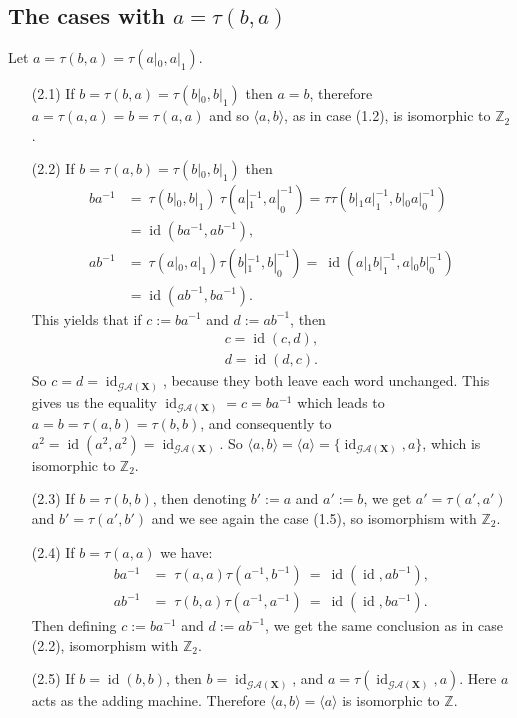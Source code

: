 \documentclass[mat1]{fmfdeloTS2.0}
\newcommand{\Z}{\mathbb Z}
\newcommand{\abece}{\mathbf{X}}			%
\newcommand{\synaut}{\mathcal{GA}}	%
\DeclareMathOperator{\id}{\mathrm{id}}			%
\begin{document}
\subsection{The cases with \texorpdfstring{$a=\tau(b,a)$}{}}

Let $a=\tau(b,a)=\tau(a|_0,a|_1)$.
\begin{itemize}
\item[(2.1)] If $b=\tau(b,a)=\tau(b|_0,b|_1)$ then $a=b$, therefore $a=\tau(a,a)=b=\tau(a,a)$ and so $\langle a,b\rangle $, as in case (1.2), is isomorphic to $\Z_2$.
\item[(2.2)] If $b=\tau(a,b)=\tau(b|_0,b|_1)$ then
\begin{align*}
 ba^{-1}&=	\:\tau(b|_0,b|_1)\:\tau(a|_1^{-1},a|_0^{-1})=	\tau\tau(b|_1a|_1^{-1},b|_0a|_0^{-1})\\
		&=\id(ba^{-1},ab^{-1}),\\
 ab^{-1}&=	\:\tau(a|_0,a|_1)\tau(b|_1^{-1},b|_0^{-1})=	\:\id(a|_1b|_1^{-1},a|_0b|_0^{-1})\\
 		&=\id(ab^{-1},ba^{-1}).
\end{align*}
This yields that if $c:=ba^{-1}$ and $d:=ab^{-1}$, then
\begin{align*}
 c=\id(c,d),\\
 d=\id(d,c).
\end{align*}
So $c=d=\id_{\synaut(\abece)}$, because they both leave each word unchanged. This gives us the equality $\id_{\synaut(\abece)}=c=ba^{-1}$ which leads to $a=b=\tau(a,b)=\tau(b,b)$, and consequently to $a^2=\id(a^2,a^2)=\id_{\synaut(\abece)}$. So $\langle a,b\rangle =\langle a\rangle =\{\id_{\synaut(\abece)},a\}$, which is isomorphic to $\Z_2$.
\item[(2.3)] If $b=\tau(b,b)$, then denoting $b':=a$ and $a':=b$, we get $a'=\tau(a',a')$ and $b'=\tau(a',b')$ and we see again the case (1.5), so isomorphism with $\Z_2$.
\item[(2.4)] If $b=\tau(a,a)$ we have:
\begin{align*}
 ba^{-1}&=\;\tau(a,a)\tau(a^{-1},b^{-1})\:=\:\id(\id,ab^{-1}),\\
 ab^{-1}&=\;\tau(b,a)\tau(a^{-1},a^{-1})\:=\:\id(\id,ba^{-1}).
\end{align*}
Then defining $c:=ba^{-1}$ and $d:=ab^{-1}$, we get the same conclusion as in case (2.2), isomorphism with $\Z_2$.
\item[(2.5)] If $b=\id(b,b)$, then $b=\id_{\synaut(\abece)}$, and $a=\tau(\id_{\synaut(\abece)},a)$. Here $a$ acts as the adding machine. Therefore $\langle a,b\rangle =\langle a\rangle $ is isomorphic to $\Z$.

\end{itemize}
\end{document}

